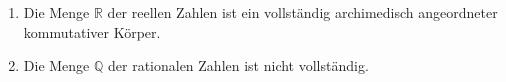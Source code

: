 \begin{enumerate}
    \item Die Menge $\mathbb{R}$ der reellen Zahlen ist ein vollständig archimedisch angeordneter kommutativer Körper.
    \item Die Menge $\mathbb{Q}$ der rationalen Zahlen ist nicht vollständig.
\end{enumerate}